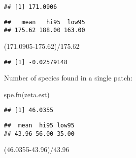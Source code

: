 \documentclass[
]{article}
\newenvironment{Shaded}{\begin{snugshade}}{\end{snugshade}}
\newcommand{\FloatTok}[1]{\textcolor[rgb]{0.00,0.00,0.81}{#1}}
\newcommand{\FunctionTok}[1]{\textcolor[rgb]{0.00,0.00,0.00}{#1}}
\newcommand{\NormalTok}[1]{#1}
\newcommand{\SpecialCharTok}[1]{\textcolor[rgb]{0.00,0.00,0.00}{#1}}
\begin{document}
\begin{verbatim}
## [1] 171.0906
\end{verbatim}

\begin{Shaded}
\end{Shaded}

\begin{verbatim}
##   mean   hi95  low95 
## 175.62 188.00 163.00
\end{verbatim}

\begin{Shaded}
\begin{Highlighting}[]
\NormalTok{(}\FloatTok{171.0905{-}175.62}\NormalTok{)}\SpecialCharTok{/}\FloatTok{175.62}
\end{Highlighting}
\end{Shaded}

\begin{verbatim}
## [1] -0.02579148
\end{verbatim}

Number of species found in a single patch:

\begin{Shaded}
\begin{Highlighting}[]
\FunctionTok{spe.fn}\NormalTok{(zeta.est)}
\end{Highlighting}
\end{Shaded}

\begin{verbatim}
## [1] 46.0355
\end{verbatim}

\begin{Shaded}
\end{Shaded}

\begin{verbatim}
##  mean  hi95 low95 
## 43.96 56.00 35.00
\end{verbatim}

\begin{Shaded}
\begin{Highlighting}[]
\NormalTok{(}\FloatTok{46.0355{-}43.96}\NormalTok{)}\SpecialCharTok{/}\FloatTok{43.96}
\end{Highlighting}
\end{Shaded}
\end{document}
